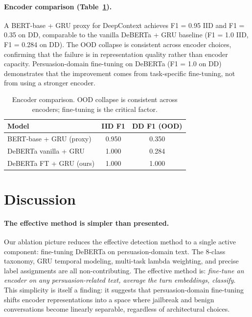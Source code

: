 \documentclass[11pt]{article}
\begin{document}
\paragraph{Encoder comparison (Table~\ref{tab:deepcontext}).}
A BERT-base + GRU proxy for DeepContext \citep{su2026deepcontext} achieves F1 = 0.95 IID and F1 = 0.35 on DD, comparable to the vanilla DeBERTa + GRU baseline (F1 = 1.0 IID, F1 = 0.284 on DD). The OOD collapse is consistent across encoder choices, confirming that the failure is in representation quality rather than encoder capacity. Persuasion-domain fine-tuning on DeBERTa (F1 = 1.0 on DD) demonstrates that the improvement comes from task-specific fine-tuning, not from using a stronger encoder.

\begin{table}[t]
\centering
\caption{Encoder comparison. OOD collapse is consistent across encoders; fine-tuning is the critical factor.}
\label{tab:deepcontext}
\begin{tabular}{lcc}
\toprule
\textbf{Model} & \textbf{IID F1} & \textbf{DD F1 (OOD)} \\
\midrule
BERT-base + GRU (proxy) & 0.950 & 0.350 \\
DeBERTa vanilla + GRU & 1.000 & 0.284 \\
DeBERTa FT + GRU (ours) & 1.000 & 1.000 \\
\bottomrule
\end{tabular}
\end{table}

\section{Discussion}

\paragraph{The effective method is simpler than presented.}
Our ablation picture reduces the effective detection method to a single active component: fine-tuning DeBERTa on persuasion-domain text. The 8-class taxonomy, GRU temporal modeling, multi-task lambda weighting, and precise label assignments are all non-contributing. The effective method is: \textit{fine-tune an encoder on any persuasion-related text, average the turn embeddings, classify}. This simplicity is itself a finding: it suggests that persuasion-domain fine-tuning shifts encoder representations into a space where jailbreak and benign conversations become linearly separable, regardless of architectural choices.
\end{document}
